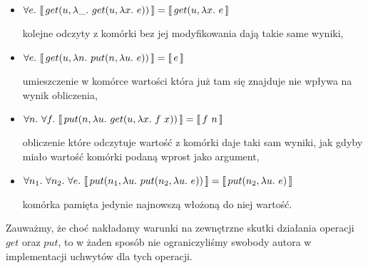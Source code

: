 \documentclass[shortabstract]{iithesis}
\begin{document}
\begin{itemize}
\item \(\forall e.\ \llbracket\, get(u, \lambda \_.\ get(u, \lambda x.\ e))\, \rrbracket = \llbracket\, get(u, \lambda x.\ e\, \rrbracket\)

  kolejne odczyty z komórki bez jej modyfikowania dają takie same wyniki,
\item \(\forall e.\ \llbracket\, get(u, \lambda n.\ put(n, \lambda u.\ e))\, \rrbracket = \llbracket\, e\, \rrbracket\)

  umieszczenie w komórce wartości która już tam się znajduje nie wpływa na wynik obliczenia,
\item \(\forall n.\ \forall f.\ \llbracket\, put(n, \lambda u.\ get(u, \lambda x.\ f\ x))\, \rrbracket = \llbracket\, f\ n\, \rrbracket\)

  obliczenie które odczytuje wartość z komórki daje taki sam wyniki, jak gdyby miało wartość komórki podaną wprost jako argument,
\item \(\forall n_1.\ \forall n_2.\ \forall e.\ \llbracket\, put(n_1, \lambda u.\ put(n_2, \lambda u.\ e))\, \rrbracket = \llbracket\, put(n_2, \lambda u.\ e)\, \rrbracket\)

  komórka pamięta jedynie najnowszą włożoną do niej wartość.
\end{itemize}

Zauważmy, że choć nakładamy warunki na zewnętrzne skutki działania operacji \(get\) oraz \(put\), to w żaden sposób nie ograniczyliśmy swobody autora w implementacji uchwytów dla tych operacji.


\end{document}
